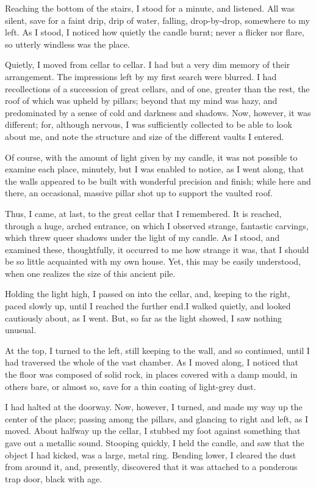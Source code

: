 Reaching the bottom of the stairs, I stood for a minute, and listened. All was silent, save for a faint drip, drip of water, falling, drop-by-drop, somewhere to my left. As I stood, I noticed how quietly the candle burnt; never a flicker nor flare, so utterly windless was the place.

Quietly, I moved from cellar to cellar. I had but a very dim memory of their arrangement. The impressions left by my first search were blurred. I had recollections of a succession of great cellars, and of one, greater than the rest, the roof of which was upheld by pillars; beyond that my mind was hazy, and predominated by a sense of cold and darkness and shadows. Now, however, it was different; for, although nervous, I was sufficiently collected to be able to look about me, and note the structure and size of the different vaults I entered.

Of course, with the amount of light given by my candle, it was not possible to examine each place, minutely, but I was enabled to notice, as I went along, that the walls appeared to be built with wonderful precision and finish; while here and there, an occasional, massive pillar shot up to support the vaulted roof.

Thus, I came, at last, to the great cellar that I remembered. It is reached, through a huge, arched entrance, on which I observed strange, fantastic carvings, which threw queer shadows under the light of my candle. As I stood, and examined these, thoughtfully, it occurred to me how strange it was, that I should be so little acquainted with my own house. Yet, this may be easily understood, when one realizes the size of this ancient pile.

Holding the light high, I passed on into the cellar, and, keeping to the right, paced slowly up, until I reached the further end.\linebreak I walked quietly, and looked cautiously about, as I went. But, so far as the light showed, I saw nothing unusual.

At the top, I turned to the left, still keeping to the wall, and so continued, until I had traversed the whole of the vast chamber. As I moved along, I noticed that the floor was composed of solid rock, in places covered with a damp mould, in others bare, or almost so, save for a thin coating of light-grey dust.

I had halted at the doorway. Now, however, I turned, and made my way up the center of the place; passing among the pillars, and glancing to right and left, as I moved. About halfway up the cellar, I stubbed my foot against something that gave out a metallic sound. Stooping quickly, I held the candle, and saw that the object I had kicked, was a large, metal ring. Bending lower, I cleared the dust from around it, and, presently, discovered that it was attached to a ponderous trap door, black with age.

